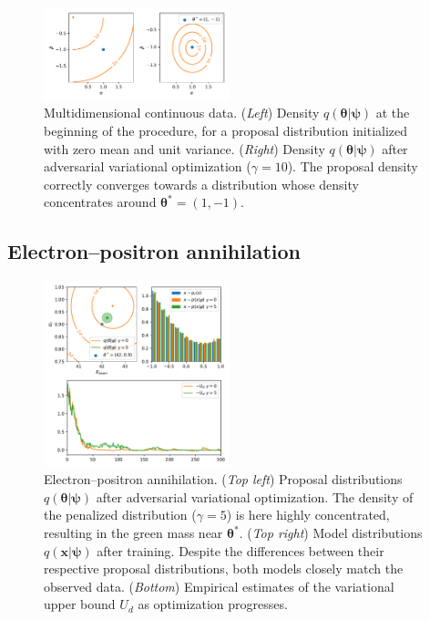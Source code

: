 \documentclass[twocolumn,superscriptaddress,aps]{revtex4-1}
\newcommand{\qxpsi}{q(\mathbf{x}|\bfpsi)}
\newcommand{\bftheta}{{\bm \theta}}
\newcommand{\bfpsi}{{\bm \psi}}
\theoremstyle{plain}
\begin{document}
\begin{figure}
    \centering
    \includegraphics[width=0.48\textwidth]{figures/multi.pdf}
    \caption{Multidimensional continuous data.
             ({\it Left}) Density $q(\bftheta|\bfpsi)$ at the beginning of the procedure, for a proposal distribution initialized with zero mean and unit variance.
             ({\it Right}) Density $q(\bftheta|\bfpsi)$ after adversarial variational optimization ($\gamma=10$). The proposal density correctly converges towards a distribution whose density concentrates around $\bftheta^* = (1, -1)$.
             }\label{fig:multi}
\end{figure}


\subsection{Electron--positron annihilation}

\begin{figure}
    \centering
    \includegraphics[width=0.48\textwidth]{figures/weinberg.pdf}
    \caption{Electron--positron annihilation.
    ({\it Top left}) Proposal distributions $q(\bftheta|\bfpsi)$ after adversarial variational optimization. The density of the penalized distribution ($\gamma=5$) is here highly concentrated, resulting in the green mass near $\bftheta^*$.
    ({\it Top right}) Model distributions $\qxpsi$ after training. Despite the differences between their respective proposal distributions, both models closely match the observed data.
    ({\it Bottom}) Empirical estimates of the variational upper bound $U_d$ as optimization progresses.
             }\label{fig:weinberg}
\end{figure}
\end{document}
